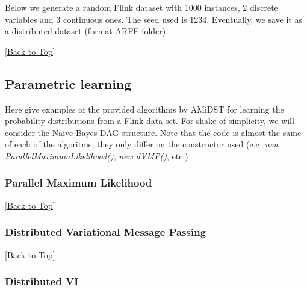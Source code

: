 \documentclass[10pt,a4paper]{article}
\newcommand{\includejavasource}[1]{}
\begin{document}
Below we generate a random Flink dataset with 1000 instances, 2 discrete variables and 3 continuous ones. The seed used is 1234. Eventually, we save it as a distributed dataset (format ARFF folder).
\includejavasource{../../../../examples/src/main/java/eu/amidst/flinklink/examples/io/DataStreamWriterExample.java}

\hyperref[sec:flinklink]{[Back to Top]}\newline 




\subsection{Parametric learning}\label{sec:flinklink:learning}

Here give examples of the provided algorithms by AMiDST for learning the probability distributions from a Flink data set. For shake of simplicity, we will consider the Naive Bayes DAG structure. Note that the code is almost the same of each of the algoritms, they only differ on the constructor used (e.g. \textit{new ParallelMaximumLikelihood()}, \textit{new dVMP()}, etc.)


\subsubsection{Parallel Maximum Likelihood}\label{sec:flinklink:learning:pml}

\includejavasource{../../../../examples/src/main/java/eu/amidst/flinklink/examples/learning/ParallelMLExample.java}

\hyperref[sec:flinklink]{[Back to Top]}\newline 


\subsubsection{Distributed Variational Message Passing}\label{sec:flinklink:learning:dvmp}

\includejavasource{../../../../examples/src/main/java/eu/amidst/flinklink/examples/learning/dVMPExample.java}

\hyperref[sec:flinklink]{[Back to Top]}\newline 


\subsubsection{Distributed VI}\label{sec:flinklink:learning:dvi}
\end{document}
